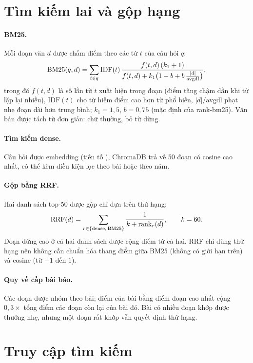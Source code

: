 \section{Tìm kiếm lai và gộp hạng}

\paragraph{BM25.} Mỗi đoạn văn $d$ được chấm điểm theo các từ $t$ của câu hỏi $q$:
\begin{equation}
\mathrm{BM25}(q,d) = \sum_{t \in q} \mathrm{IDF}(t)\,\frac{f(t,d)\,(k_1+1)}{f(t,d) + k_1\bigl(1 - b + b\,\frac{|d|}{\mathrm{avgdl}}\bigr)},
\label{eq:bm25}
\end{equation}
trong đó $f(t,d)$ là số lần từ $t$ xuất hiện trong đoạn (điểm tăng chậm dần khi từ lặp lại nhiều),
$\mathrm{IDF}(t)$ cho từ hiếm điểm cao hơn từ phổ biến, $|d|/\mathrm{avgdl}$ phạt nhẹ đoạn dài hơn trung bình;
$k_1 = 1{,}5$, $b = 0{,}75$ (mặc định của rank-bm25). Văn bản được tách từ đơn giản: chữ thường, bỏ từ dừng.

\paragraph{Tìm kiếm dense.} Câu hỏi được embedding (tiền tố ), ChromaDB trả về 50 đoạn có cosine cao
nhất, có thể kèm điều kiện lọc theo bài hoặc theo năm.

\paragraph{Gộp bằng RRF.} Hai danh sách top-50 được gộp chỉ dựa trên thứ hạng:
\begin{equation}
\mathrm{RRF}(d) = \sum_{r \in \{\mathrm{dense},\,\mathrm{BM25}\}} \frac{1}{k + \mathrm{rank}_r(d)}, \qquad k = 60.
\label{eq:rrf}
\end{equation}
Đoạn đứng cao ở cả hai danh sách được cộng điểm từ cả hai. RRF chỉ dùng thứ hạng nên không cần chuẩn hóa thang
điểm giữa BM25 (không có giới hạn trên) và cosine (từ $-1$ đến $1$).

\paragraph{Quy về cấp bài báo.} Các đoạn được nhóm theo bài; điểm của bài bằng điểm đoạn cao nhất cộng
$0{,}3 \times$ tổng điểm các đoạn còn lại của bài đó. Bài có nhiều đoạn khớp được thưởng nhẹ, nhưng một đoạn rất
khớp vẫn quyết định thứ hạng.

\section{Truy cập tìm kiếm}

